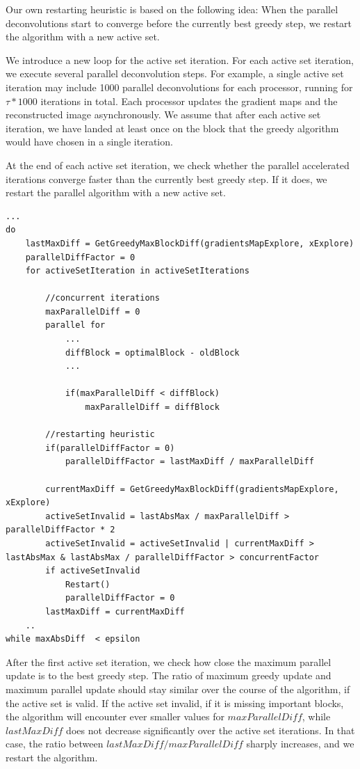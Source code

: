 Our own restarting heuristic is based on the following idea: When the parallel deconvolutions start to converge before the currently best greedy step, we restart the algorithm with a new active set.

We introduce a new loop for the active set iteration. For each active set iteration, we execute several parallel deconvolution steps. For example, a single active set iteration may include 1000 parallel deconvolutions for each processor, running for $\tau * 1000$ iterations in total. Each processor updates the gradient maps and the reconstructed image asynchronously. We assume that after each active set iteration, we have landed at least once on the block that the greedy algorithm would have chosen in a single iteration.

At the end of each active set iteration, we check whether the parallel accelerated iterations converge faster than the currently best greedy step. If it does, we restart the parallel algorithm with a new active set.

\begin{lstlisting}
...
do
	lastMaxDiff = GetGreedyMaxBlockDiff(gradientsMapExplore, xExplore)
	parallelDiffFactor = 0
	for activeSetIteration in activeSetIterations
		
		//concurrent iterations
		maxParallelDiff = 0
		parallel for
			...
			diffBlock = optimalBlock - oldBlock
			...
			
			if(maxParallelDiff < diffBlock)
				maxParallelDiff = diffBlock
				
		//restarting heuristic
		if(parallelDiffFactor = 0)
			parallelDiffFactor = lastMaxDiff / maxParallelDiff
		
		currentMaxDiff = GetGreedyMaxBlockDiff(gradientsMapExplore, xExplore)
		activeSetInvalid = lastAbsMax / maxParallelDiff > parallelDiffFactor * 2
		activeSetInvalid = activeSetInvalid | currentMaxDiff > lastAbsMax & lastAbsMax / parallelDiffFactor > concurrentFactor
		if activeSetInvalid
			Restart()
			parallelDiffFactor = 0
		lastMaxDiff = currentMaxDiff
	..
while maxAbsDiff  < epsilon
\end{lstlisting}

After the first active set iteration, we check how close the maximum parallel update is to the best greedy step. The ratio of maximum greedy update and maximum parallel update should stay similar over the course of the algorithm, if the active set is valid. If the active set invalid, if it is missing important blocks, the algorithm will encounter ever smaller values for $maxParallelDiff$, while $lastMaxDiff$ does not decrease significantly over the active set iterations. In that case, the ratio between $lastMaxDiff / maxParallelDiff$ sharply increases, and we restart the algorithm.

